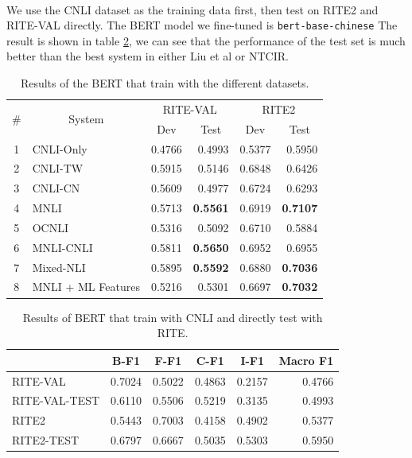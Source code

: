 \documentclass[12pt]{article}
\begin{document}
\begin{CJK*}{UTF8}{bkai}
\begin{spacing}{1.77}
\paragraph{}
We use the CNLI dataset as the training data first, then test on RITE2 and RITE-VAL directly. The BERT model we fine-tuned is \texttt{bert-base-chinese} The result is shown in table \ref{result:bert_cnli}, we can see that the performance of the test set is much better than the best system in either Liu et al or NTCIR.
\begin{table}[!ht]
  \centering
  \begin{tabular}{|c|l|r|r|r|r|}
  \hline
  \multirow{2}{*}{\#} & \multicolumn{1}{c|}{\multirow{2}{*}{System}} & \multicolumn{2}{c|}{RITE-VAL} & \multicolumn{2}{c|}{RITE2} \\ \cline{3-6}
   & \multicolumn{1}{c|}{} & \multicolumn{1}{c|}{Dev} & \multicolumn{1}{c|}{Test} & \multicolumn{1}{c|}{Dev} & \multicolumn{1}{c|}{Test} \\ \hline
  1 & CNLI-Only & 0.4766 & 0.4993 & 0.5377 & 0.5950 \\ \hline
  2 & CNLI-TW & 0.5915 & 0.5146 & 0.6848 & 0.6426 \\ \hline
  3 & CNLI-CN & 0.5609 & 0.4977 & 0.6724 & 0.6293 \\ \hline
  4 & MNLI & 0.5713 & \textbf{0.5561} & 0.6919 & \textbf{0.7107} \\ \hline
  5 & OCNLI & 0.5316 & 0.5092 & 0.6710 & 0.5884 \\ \hline
  6 & MNLI-CNLI & 0.5811 & \textbf{0.5650} & 0.6952 & 0.6955 \\ \hline
  7 & Mixed-NLI & 0.5895 & \textbf{0.5592} & 0.6880 & \textbf{0.7036} \\ \hline
  8 & MNLI + ML Features & 0.5216 & 0.5301 & 0.6697 & \textbf{0.7032} \\ \hline
  \end{tabular}
  \caption{Results of the BERT that train with the different datasets.}
  \label{result:bert_compare}
\end{table}

\begin{table}[ht!]
  \centering
  \begin{tabular}{|l|r|r|r|r|r|}
  \hline
   & \multicolumn{1}{c|}{B-F1} & \multicolumn{1}{c|}{F-F1} & \multicolumn{1}{c|}{C-F1} & \multicolumn{1}{c|}{I-F1} & \multicolumn{1}{c|}{Macro F1} \\ \hline
  RITE-VAL & 0.7024 & 0.5022 & 0.4863 & 0.2157 & 0.4766 \\ \hline
  RITE-VAL-TEST & 0.6110 & 0.5506 & 0.5219 & 0.3135 & 0.4993 \\ \hline
  RITE2 & 0.5443 & 0.7003 & 0.4158 & 0.4902 & 0.5377 \\ \hline
  RITE2-TEST & 0.6797 & 0.6667 & 0.5035 & 0.5303 & 0.5950 \\ \hline
  \end{tabular}
  \caption{Results of BERT that train with CNLI and directly test with RITE.}
  \label{result:bert_cnli}
\end{table}


\end{spacing}
\end{CJK*}
\end{document}
